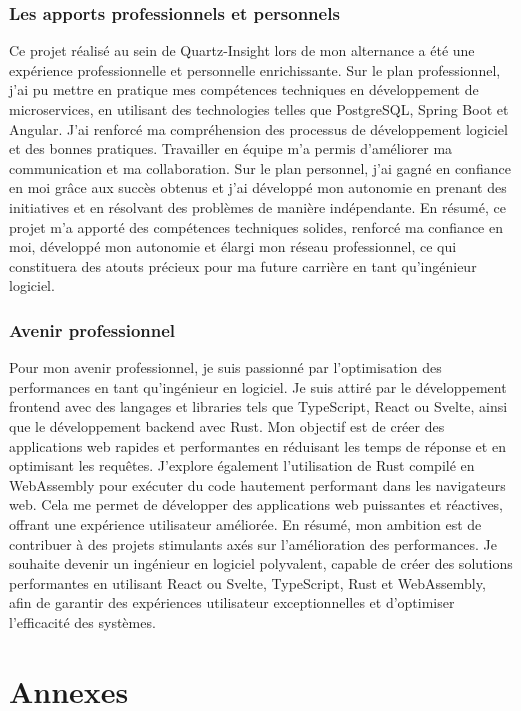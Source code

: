 \documentclass[a4paper, 11pt]{report}
\begin{document}
\subsection{Les apports professionnels et personnels}
Ce projet réalisé au sein de Quartz-Insight lors de mon alternance a été une expérience professionnelle et personnelle enrichissante.
Sur le plan professionnel, j'ai pu mettre en pratique mes compétences techniques en développement de microservices, en utilisant des technologies telles que PostgreSQL, Spring Boot et Angular.
J'ai renforcé ma compréhension des processus de développement logiciel et des bonnes pratiques. 
Travailler en équipe m'a permis d'améliorer ma communication et ma collaboration.
Sur le plan personnel, j'ai gagné en confiance en moi grâce aux succès obtenus et j'ai développé mon autonomie en prenant des initiatives et en résolvant des problèmes de manière indépendante.
En résumé, ce projet m'a apporté des compétences techniques solides, renforcé ma confiance en moi, développé mon autonomie et élargi mon réseau professionnel, ce qui constituera des atouts précieux pour ma future carrière en tant qu'ingénieur logiciel.

\subsection{Avenir professionnel}
Pour mon avenir professionnel, je suis passionné par l'optimisation des performances en tant qu'ingénieur en logiciel. Je suis attiré par le développ\-ement frontend avec des langages et libraries tels que TypeScript, React ou Svelte, ainsi que le développement backend avec Rust. Mon objectif est de créer des applications web rapides et performantes en réduisant les temps de réponse et en optimisant les requêtes.
J'explore également l'utilisation de Rust compilé en WebAssembly pour exécuter du code hautement performant dans les navigateurs web. Cela me permet de développer des applications web puissantes et réactives, offrant une expérience utilisateur améliorée.
En résumé, mon ambition est de contribuer à des projets stimulants axés sur l'amélioration des performances. Je souhaite devenir un ingénieur en logiciel polyvalent, capable de créer des solutions performantes en utilisant React ou Svelte, TypeScript, Rust et WebAssembly, afin de garantir des expériences utilisateur exceptionnelles et d'optimiser l'efficacité des systèmes.

\appendix
\chapter*{Annexes}
\end{document}
